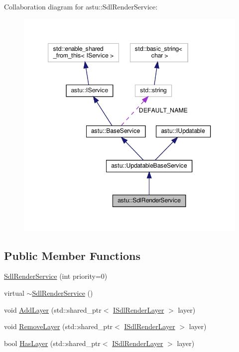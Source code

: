 Collaboration diagram for astu\+:\+:Sdl\+Render\+Service\+:\nopagebreak
\begin{figure}[H]
\begin{center}
\leavevmode
\includegraphics[width=347pt]{classastu_1_1SdlRenderService__coll__graph}
\end{center}
\end{figure}
\subsection*{Public Member Functions}
\begin{DoxyCompactItemize}
\item 
\hyperlink{classastu_1_1SdlRenderService_a8669793d9701f979c90cd802575a2645}{Sdl\+Render\+Service} (int priority=0)
\item 
virtual \hyperlink{classastu_1_1SdlRenderService_a0ec8c27982cfa6ace6b28e50fba78f2a}{$\sim$\+Sdl\+Render\+Service} ()
\item 
void \hyperlink{classastu_1_1SdlRenderService_af025dba6e6ada1f09badaa6de75292d1}{Add\+Layer} (std\+::shared\+\_\+ptr$<$ \hyperlink{classastu_1_1ISdlRenderLayer}{I\+Sdl\+Render\+Layer} $>$ layer)
\item 
void \hyperlink{classastu_1_1SdlRenderService_a88ffe81ca6348b12b0185310932bd4ee}{Remove\+Layer} (std\+::shared\+\_\+ptr$<$ \hyperlink{classastu_1_1ISdlRenderLayer}{I\+Sdl\+Render\+Layer} $>$ layer)
\item 
bool \hyperlink{classastu_1_1SdlRenderService_a45016463f301b52b1ffacfa976eb9849}{Has\+Layer} (std\+::shared\+\_\+ptr$<$ \hyperlink{classastu_1_1ISdlRenderLayer}{I\+Sdl\+Render\+Layer} $>$ layer)
\end{DoxyCompactItemize}
